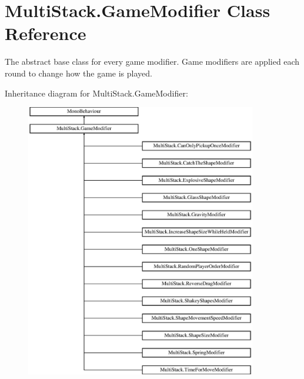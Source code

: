 \hypertarget{class_multi_stack_1_1_game_modifier}{}\section{Multi\+Stack.\+Game\+Modifier Class Reference}
\label{class_multi_stack_1_1_game_modifier}


The abstract base class for every game modifier. Game modifiers are applied each round to change how the game is played.  


Inheritance diagram for Multi\+Stack.\+Game\+Modifier\+:\begin{figure}[H]
\begin{center}
\leavevmode
\includegraphics[height=12.000000cm]{class_multi_stack_1_1_game_modifier}
\end{center}
\end{figure}
